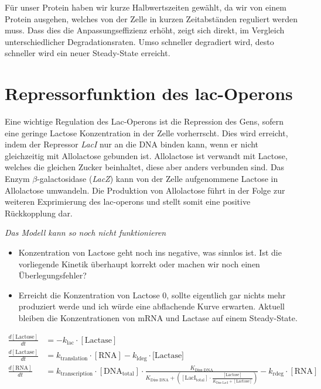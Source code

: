 \documentclass{article}
\begin{document}
Für unser Protein haben wir kurze Halbwertszeiten gewählt, da wir von einem Protein ausgehen, welches von der Zelle in kurzen Zeitabständen reguliert werden muss. Dass dies die Anpassungseffizienz erhöht, zeigt sich direkt, im Vergleich unterschiedlicher Degradationsraten. Umso schneller degradiert wird, desto schneller wird ein neuer Steady-State erreicht.

\section*{Repressorfunktion des lac-Operons}

Eine wichtige Regulation des Lac-Operons ist die Repression des Gens, sofern eine geringe Lactose Konzentration in der Zelle vorherrscht. Dies wird erreicht, indem der Repressor \emph{LacI} nur an die DNA binden kann, wenn er nicht gleichzeitig mit Allolactose gebunden ist. Allolactose ist verwandt mit Lactose, welches die gleichen Zucker beinhaltet, diese aber anders verbunden sind. Das Enzym $\beta$-galactosidase (\emph{LacZ}) kann von der Zelle aufgenommene Lactose in Allolactose umwandeln. Die Produktion von Allolactose führt in der Folge zur weiteren Exprimierung des lac-operons und stellt somit eine positive Rückkopplung dar.
\par

\emph{Das Modell kann so noch nicht funktionieren}
\begin{itemize}
    \item Konzentration von Lactose geht noch ins negative, was sinnlos ist. Ist die vorliegende Kinetik überhaupt korrekt oder machen wir noch einen Überlegungsfehler?
    \item Erreicht die Konzentration von Lactose 0, sollte eigentlich gar nichts mehr produziert werde und ich würde eine abflachende Kurve erwarten. Aktuell bleiben die Konzentrationen von mRNA und Lactase auf einem Steady-State.
\end{itemize}

\begin{align*}
    \frac{d[\text{Lactose}]}{dt}&=-k_\text{lac}\cdot [\text{Lactase}] \\
    \frac{d[\text{Lactase}]}{dt}&=k_\text{translation}\cdot[\text{RNA}]-k_\text{ldeg}\cdot [\text{Lactase]}\\
    \frac{d[\text{RNA}]}{dt}&=k_\text{transcription}\cdot[\text{DNA}_\text{total}]\cdot\frac{K_\text{Diss DNA}}{K_\text{Diss DNA}+([\text{LacI}_\text{total}]\cdot\frac{[\text{Lactose}]}{K_\text{Diss LacI}+[\text{Lactose}]})}-k_\text{rdeg}\cdot[\text{RNA}]
\end{align*}

\printbibliography[title=References]
\end{document}
